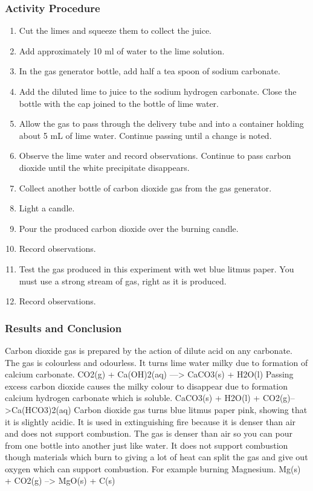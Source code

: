 \subsubsection*{Activity Procedure}
\begin{enumerate}
\item{Cut the limes and squeeze them to collect the juice.}
\item{Add approximately 10 ml of water to the lime solution.}
\item{In the gas generator bottle, add half a tea spoon of sodium carbonate.}
\item{Add the diluted lime to juice to the sodium hydrogen carbonate. Close the bottle with the cap joined to the bottle of lime water.}
\item{Allow the gas to pass through the delivery tube and into a container holding about 5 mL of lime water. Continue passing until a change is noted.}
\item{Observe the lime water and record observations. Continue to pass carbon dioxide until the white precipitate disappears.}
\item{Collect another bottle of carbon dioxide gas from the gas generator.}
\item{Light a candle.}
\item{Pour the produced carbon dioxide over the burning candle.}
\item{Record observations.}
\item{Test the gas produced in this experiment with wet blue litmus paper. You must use a strong stream of gas, right as it is produced.}
\item{Record observations.}
\end{enumerate}

\subsubsection*{Results and Conclusion}
Carbon dioxide gas is prepared by the action of dilute acid on any carbonate. The gas is colourless and odourless. It turns lime water milky due to formation of calcium carbonate.  
CO2(g)  + Ca(OH)2(aq) ---> CaCO3(s)  +  H2O(l)
Passing excess carbon dioxide causes the milky colour to disappear due to formation calcium hydrogen carbonate which is soluble.
CaCO3(s)  +  H2O(l)  +  CO2(g)-->Ca(HCO3)2(aq)
Carbon dioxide gas turns blue litmus paper pink, showing that it is slightly acidic. It is used in extinguishing fire because it is denser than air and does not support combustion.
The gas is denser than air so you can pour from one bottle into another just like water. It does not support combustion though materials which burn to giving a lot of heat can split the gas and give out oxygen which can support combustion. For example burning Magnesium.
Mg(s) + CO2(g) --> MgO(s)  +  C(s)

